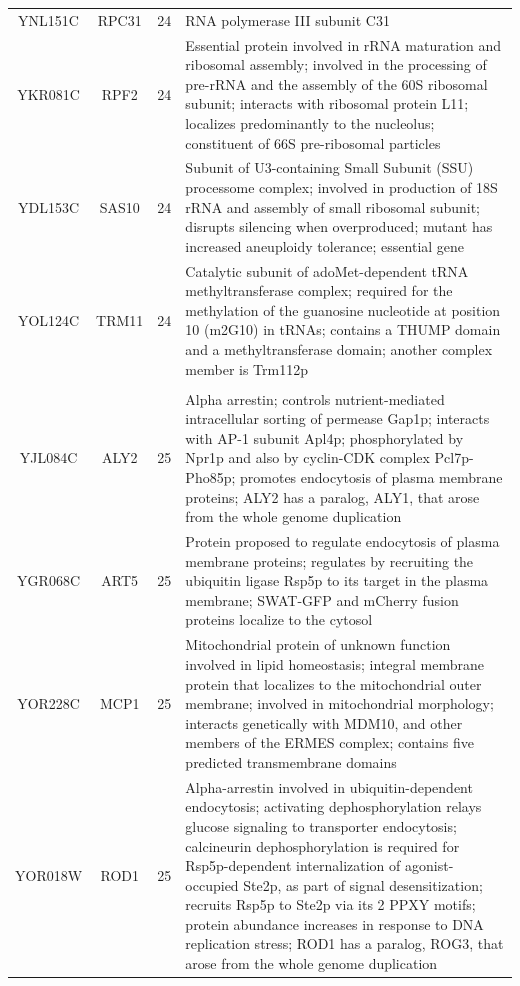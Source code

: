 \documentclass[]{article}
\begin{document}
\begin{longtable}{@{\extracolsep{3pt}} cccp{85mm}}
YNL151C & RPC31 & 24 & RNA polymerase III subunit C31 \\ 
YKR081C & RPF2 & 24 & Essential protein involved in rRNA maturation and ribosomal assembly; involved in the processing of pre-rRNA and the assembly of the 60S ribosomal subunit; interacts with ribosomal protein L11; localizes predominantly to the nucleolus; constituent of 66S pre-ribosomal particles \\ 
YDL153C & SAS10 & 24 & Subunit of U3-containing Small Subunit (SSU) processome complex; involved in production of 18S rRNA and assembly of small ribosomal subunit; disrupts silencing when overproduced; mutant has increased aneuploidy tolerance; essential gene \\ 
YOL124C & TRM11 & 24 & Catalytic subunit of adoMet-dependent tRNA methyltransferase complex; required for the methylation of the guanosine nucleotide at position 10 (m2G10) in tRNAs; contains a THUMP domain and a methyltransferase domain; another complex member is Trm112p \\   \hline \\ [-1.8ex] 
YJL084C & ALY2 & 25 & Alpha arrestin; controls nutrient-mediated intracellular sorting of permease Gap1p; interacts with AP-1 subunit Apl4p; phosphorylated by Npr1p and also by cyclin-CDK complex Pcl7p-Pho85p; promotes endocytosis of plasma membrane proteins; ALY2 has a paralog, ALY1, that arose from the whole genome duplication \\ 
YGR068C & ART5 & 25 & Protein proposed to regulate endocytosis of plasma membrane proteins; regulates by recruiting the ubiquitin ligase Rsp5p to its target in the plasma membrane; SWAT-GFP and mCherry fusion proteins localize to the cytosol \\ 
YOR228C & MCP1 & 25 & Mitochondrial protein of unknown function involved in lipid homeostasis; integral membrane protein that localizes to the mitochondrial outer membrane; involved in mitochondrial morphology; interacts genetically with MDM10, and other members of the ERMES complex; contains five predicted transmembrane domains \\ 
YOR018W & ROD1 & 25 & Alpha-arrestin involved in ubiquitin-dependent endocytosis; activating dephosphorylation relays glucose signaling to transporter endocytosis; calcineurin dephosphorylation is required for Rsp5p-dependent internalization of agonist-occupied Ste2p, as part of signal desensitization; recruits Rsp5p to Ste2p via its 2 PPXY motifs; protein abundance increases in response to DNA replication stress; ROD1 has a paralog, ROG3, that arose from the whole genome duplication \\ 

\end{longtable}
\end{document}
